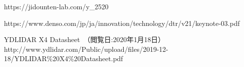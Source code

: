 \begin{thebibliography}{9}
  https://jidounten-lab.com/y_2520

  https://www.denso.com/jp/ja/innovation/technology/dtr/v21/keynote-03.pdf


   YDLIDAR X4 Datasheet　（閲覧日:2020年1月18日）\\
    http://www.ydlidar.com/Public/upload/files/2019-12-18/YDLIDAR\%20X4\%20Datasheet.pdf

\end{thebibliography}